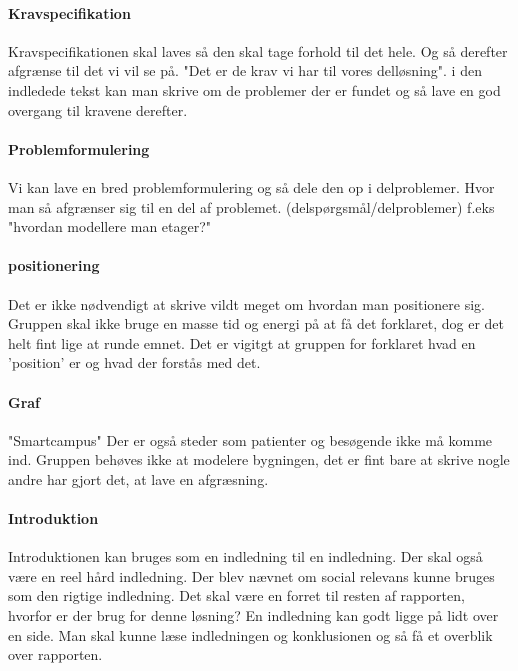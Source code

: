\documentclass[article,11pt]{memoir}
\begin{document}
\paragraph{Kravspecifikation}
Kravspecifikationen skal laves så den skal tage forhold til det hele. Og så derefter afgrænse til det vi vil se på. "Det er de krav vi har til vores delløsning". i den indledede tekst kan man skrive om de problemer der er fundet og så lave en god overgang til kravene derefter. 


\paragraph{Problemformulering}
Vi kan lave en bred problemformulering og så dele den op i delproblemer. Hvor man så afgrænser sig til en del af problemet. (delspørgsmål/delproblemer)
f.eks "hvordan modellere man etager?"  


\paragraph{positionering}
Det er ikke nødvendigt at skrive vildt meget om hvordan man positionere sig. Gruppen skal ikke bruge en masse tid og energi på at få det forklaret, dog er det helt fint lige at runde emnet. 
Det er vigitgt at gruppen for forklaret hvad en 'position' er og hvad der forstås med det.


\paragraph{Graf}
"Smartcampus" 
Der er også steder som patienter og besøgende ikke må komme ind. Gruppen behøves ikke at modelere bygningen, det er fint bare at skrive nogle andre har gjort det, at lave en afgræsning.


\paragraph{Introduktion}
Introduktionen kan bruges som en indledning til en indledning. Der skal også være en reel hård indledning. Der blev nævnet om social relevans kunne bruges som den rigtige indledning. Det skal være en forret til resten af rapporten, hvorfor er der brug for denne løsning? En indledning kan godt ligge på lidt over en side. Man skal kunne læse indledningen og konklusionen og så få et overblik over rapporten.  
\end{document}
